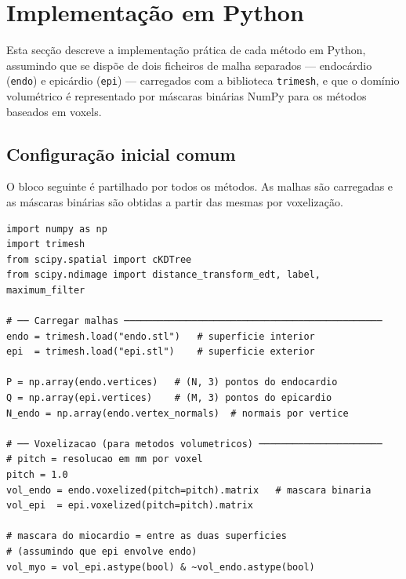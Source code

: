 %

\section{Implementação em Python}
\label{sec:implementacao}

Esta secção descreve a implementação prática de cada método em Python,
assumindo que se dispõe de dois ficheiros de malha separados ---
endocárdio (\texttt{endo}) e epicárdio (\texttt{epi}) --- carregados
com a biblioteca \texttt{trimesh}, e que o domínio volumétrico é
representado por máscaras binárias NumPy para os métodos baseados em
voxels.

\subsection*{Configuração inicial comum}

O bloco seguinte é partilhado por todos os métodos.
As malhas são carregadas e as máscaras binárias são obtidas
a partir das mesmas por voxelização.

\begin{lstlisting}
import numpy as np
import trimesh
from scipy.spatial import cKDTree
from scipy.ndimage import distance_transform_edt, label, maximum_filter

# ── Carregar malhas ──────────────────────────────────────────────
endo = trimesh.load("endo.stl")   # superficie interior
epi  = trimesh.load("epi.stl")    # superficie exterior

P = np.array(endo.vertices)   # (N, 3) pontos do endocardio
Q = np.array(epi.vertices)    # (M, 3) pontos do epicardio
N_endo = np.array(endo.vertex_normals)  # normais por vertice

# ── Voxelizacao (para metodos volumetricos) ──────────────────────
# pitch = resolucao em mm por voxel
pitch = 1.0
vol_endo = endo.voxelized(pitch=pitch).matrix   # mascara binaria
vol_epi  = epi.voxelized(pitch=pitch).matrix

# mascara do miocardio = entre as duas superficies
# (assumindo que epi envolve endo)
vol_myo = vol_epi.astype(bool) & ~vol_endo.astype(bool)
\end{lstlisting}

